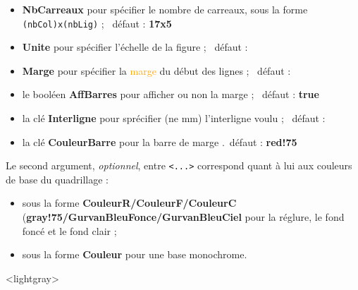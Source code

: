 \documentclass[a4paper]{article}
\newcommand\Cle[1]{{\bfseries\sffamily\textlangle #1\textrangle}}
\begin{document}
\begin{itemize}
	\item \Cle{NbCarreaux} pour spécifier le nombre de carreaux, sous la forme \texttt{(nbCol)x(nbLig)} ; \hfill~défaut : \Cle{17x5}
	\item \Cle{Unite} pour spécifier l'échelle de la figure ; \hfill~défaut : \Cle{1}
	\item \Cle{Marge} pour spécifier la \textcolor{orange}{marge} du début des lignes ; \hfill~défaut : \Cle{4}
	\item le booléen \Cle{AffBarres} pour afficher ou non la marge ; \hfill~défaut : \Cle{true}
	\item la clé \Cle{Interligne} pour sprécifier (ne mm) l'interligne voulu ; \hfill~défaut : \Cle{3}
	\item la clé \Cle{CouleurBarre} pour la barre de marge .\hfill~défaut : \Cle{red!75}
\end{itemize}

Le second argument, \textit{optionnel}, entre \texttt{<...>} correspond quant à lui aux couleurs de base du quadrillage :

\begin{itemize}
	\item sous la forme \Cle{CouleurR/CouleurF/CouleurC} (\Cle{gray!75/GurvanBleuFonce/GurvanBleuCiel} pour la réglure, le fond foncé et le fond clair ;
	\item sous la forme \Cle{Couleur} pour une base monochrome.
\end{itemize}

\begin{PresentationCode}{}
\PapierGurvan[Interligne=3,NbCarreaux=10x2,Marge=2]
\end{PresentationCode}

\begin{PresentationCode}{}
\PapierGurvan[Interligne=2,NbCarreaux=14x3,Marge=1]<lightgray>
\end{PresentationCode}
\end{document}
